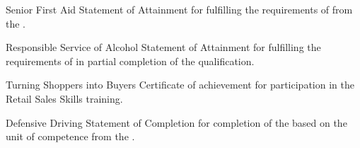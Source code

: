 \begin{qualifications}

{Senior First Aid}
{Statement of Attainment for fulfilling the requirements of
 from the
.}

{Responsible Service of Alcohol}
{Statement of Attainment for fulfilling the requirements of
 in
partial completion of the  qualification.}

{Turning Shoppers into Buyers}
{Certificate of achievement for participation in the 
 Retail Sales Skills training.}

{Defensive Driving}
{Statement of Completion for completion of the  based on the unit of competence
 from the
.}

\end{qualifications}
